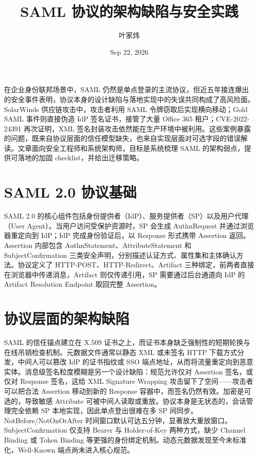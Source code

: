 \title{SAML 协议的架构缺陷与安全实践}
\author{叶家炜}
\date{Sep 22, 2026}
\maketitle
在企业身份联邦场景中，SAML 仍然是单点登录的主流协议，但近五年接连爆出的安全事件表明，协议本身的设计缺陷与落地实现中的失误共同构成了高风险面。SolarWinds 供应链攻击中，攻击者利用 SAML 令牌窃取后实现横向移动；Gold SAML 事件则直接伪造 IdP 签名证书，接管了大量 Office 365 租户；CVE-2022-24391 再次证明，XML 签名封装攻击依然能在生产环境中被利用。这些案例暴露的问题，既来自协议层面的信任模型缺失，也来自实现层面对可选字段的错误解读。文章面向安全工程师和系统架构师，目标是系统梳理 SAML 的架构弱点，提供可落地的加固 checklist，并给出迁移策略。\par
\chapter{SAML 2.0 协议基础}
SAML 2.0 的核心组件包括身份提供者（IdP）、服务提供者（SP）以及用户代理（User Agent）。当用户访问受保护资源时，SP 会生成 AuthnRequest 并通过浏览器重定向到 IdP；IdP 完成身份验证后，以 Response 形式携带 Assertion 返回。Assertion 内部包含 AuthnStatement、AttributeStatement 和 SubjectConfirmation 三类安全声明，分别描述认证方式、属性集和主体确认方法。协议定义了 HTTP-POST、HTTP-Redirect、Artifact 三种绑定，前两者直接在浏览器中传递消息，Artifact 则仅传递引用，SP 需要通过后台通道向 IdP 的 Artifact Resolution Endpoint 取回完整 Assertion。\par
\chapter{协议层面的架构缺陷}
SAML 的信任锚点建立在 X.509 证书之上，而证书本身缺乏强制性的短期轮换与在线吊销检查机制。元数据文件通常以静态 XML 或未签名 HTTP 下载方式分发，中间人可以篡改 IdP 的证书指纹或 SSO 端点地址，从而将流量重定向到恶意实体。消息级签名粒度模糊是另一个设计缺陷：规范允许仅对 Assertion 签名，或仅对 Response 签名，这给 XML Signature Wrapping 攻击留下了空间——攻击者可以把合法 Assertion 移动到新的 Response 容器中，而签名仍然有效。加密是可选的，导致敏感 Attribute 可被中间人读取或重放。协议本身是无状态的，会话管理完全依赖 SP 本地实现，因此单点登出很难在多 SP 间同步。NotBefore/NotOnOrAfter 时间窗口默认可达五分钟，显著放大重放窗口。SubjectConfirmation 仅支持 Bearer 与 Holder-of-Key 两种方式，缺少 Channel Binding 或 Token Binding 等更强的身份绑定机制。动态元数据发现至今未标准化，Well-Known 端点尚未进入核心规范。\par
